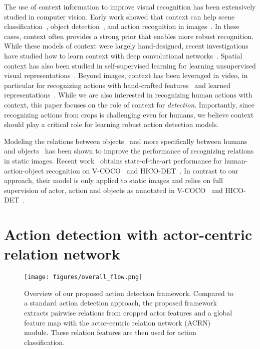 \documentclass[runningheads]{llncs}
\begin{document}
 The use of context information to improve visual recognition has been extensively studied in computer vision. Early work showed that context can help scene classification~\cite{oliva2001modeling}, object detection~\cite{gupta2015exploring,heitz2008learning,mottaghi2014role,rabinovich2007objects,torralba2003context}, and action recognition in images~\cite{yao2010modeling}. In these cases, context often provides a strong prior that enables more robust recognition.  While these models of context were largely hand-designed, recent investigations have studied how to learn context with deep convolutional networks~\cite{shrivastava2016contextual,shrivastava2016beyond}. Spatial context has also been studied in self-supervised learning for learning unsupervised visual representations~\cite{doersch2015unsupervised,pathak2016context}. Beyond images, context has been leveraged in video, in particular for recognizing actions with hand-crafted features~\cite{Marszalek2009} and learned representations~\cite{girdhar2017attentional,sharma2015action}. While we are also interested in recognizing human actions with context, this paper focuses on the role of context for \emph{detection}. Importantly, since recognizing actions from crops is challenging even for humans, we believe context should play a critical role for learning robust action detection models.


Modeling the relations between objects~\cite{Peyre_2017_ICCV,lu2016visual} and more specifically between humans and objects~\cite{gkioxari2017interactnet,gupta2015} has been shown to improve the performance of recognizing relations in static images. Recent work~\cite{gkioxari2017interactnet} obtains state-of-the-art performance for  human-action-object recognition on V-COCO~\cite{gupta2015} and HICO-DET~\cite{hico_det_wacv2018}. In contrast to our approach, their model is only applied to static images and relies on full supervision of actor, action and objects as annotated in V-COCO~\cite{gupta2015} and HICO-DET~\cite{hico_det_wacv2018}. 
 
\section{Action detection with actor-centric relation network}

\begin{figure}[t]
    \centering
    \texttt{[image: figures/overall\_flow.png]}
    \caption{Overview of our proposed action detection framework. Compared to a standard action detection approach, the proposed framework extracts pairwise relations from cropped actor features and a global feature map with the actor-centric relation network (ACRN) module. These relation features are then used for action classification.}
    \label{fig:overall_flow}
\end{figure}
\end{document}
